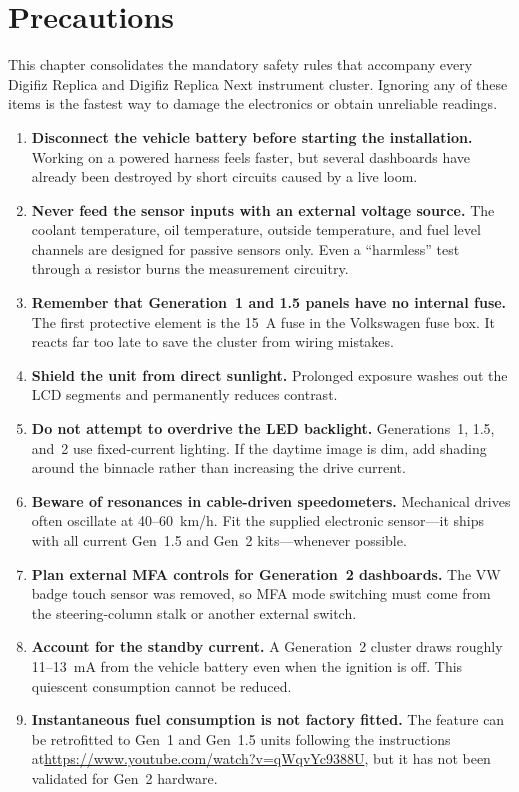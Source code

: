 \chapter{Precautions}\label{ch:precautions}

This chapter consolidates the mandatory safety rules that accompany every Digifiz Replica and Digifiz Replica Next instrument cluster. Ignoring any of these items is the fastest way to damage the electronics or obtain unreliable readings.

\begin{enumerate}
    \item \textbf{Disconnect the vehicle battery before starting the installation.} Working on a powered harness feels faster, but several dashboards have already been destroyed by short circuits caused by a live loom.
    \item \textbf{Never feed the sensor inputs with an external voltage source.} The coolant temperature, oil temperature, outside temperature, and fuel level channels are designed for passive sensors only. Even a “harmless” test through a resistor burns the measurement circuitry.
    \item \textbf{Remember that Generation~1 and 1.5 panels have no internal fuse.} The first protective element is the 15~A fuse in the Volkswagen fuse box. It reacts far too late to save the cluster from wiring mistakes.
    \item \textbf{Shield the unit from direct sunlight.} Prolonged exposure washes out the LCD segments and permanently reduces contrast.
    \item \textbf{Do not attempt to overdrive the LED backlight.} Generations~1, 1.5, and~2 use fixed-current lighting. If the daytime image is dim, add shading around the binnacle rather than increasing the drive current.
    \item \textbf{Beware of resonances in cable-driven speedometers.} Mechanical drives often oscillate at 40--60~km/h. Fit the supplied electronic sensor---it ships with all current Gen~1.5 and Gen~2 kits---whenever possible.
    \item \textbf{Plan external MFA controls for Generation~2 dashboards.} The VW badge touch sensor was removed, so MFA mode switching must come from the steering-column stalk or another external switch.
    \item \textbf{Account for the standby current.} A Generation~2 cluster draws roughly 11--13~mA from the vehicle battery even when the ignition is off. This quiescent consumption cannot be reduced.
    \item \textbf{Instantaneous fuel consumption is not factory fitted.} The feature can be retrofitted to Gen~1 and Gen~1.5 units following the instructions at\newline\url{https://www.youtube.com/watch?v=qWqvYc9388U}, but it has not been validated for Gen~2 hardware.
\end{enumerate}

